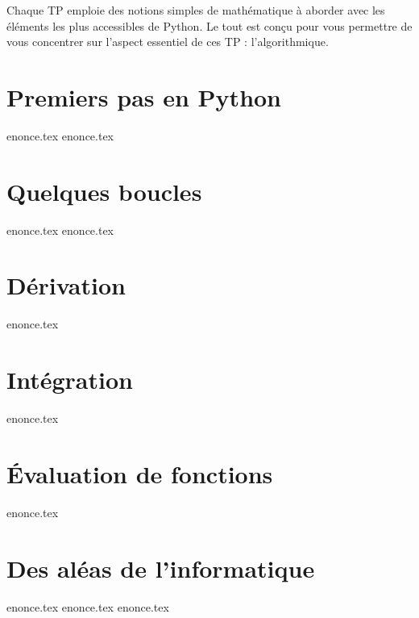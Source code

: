 \documentclass[a4paper,11pt]{article}
\begin{document}
Chaque TP emploie des notions simples de mathématique à aborder avec 
les éléments les plus accessibles de Python. Le tout est conçu pour vous
permettre de vous concentrer sur l'aspect essentiel de ces TP :
l'algorithmique. 


\pagebreak
\section{Premiers pas en Python}
{enonce.tex}
\pagebreak
{enonce.tex}
\pagebreak
\section{Quelques boucles}
{enonce.tex}
\pagebreak
{enonce.tex}
\pagebreak
\section{Dérivation}
{enonce.tex}
\pagebreak
\section{Intégration}
{enonce.tex}
\pagebreak
\section{Évaluation de fonctions}
{enonce.tex}
\pagebreak
\section{Des aléas de l'informatique}
{enonce.tex}
\pagebreak
{enonce.tex}
\pagebreak
{enonce.tex}
\end{document}
